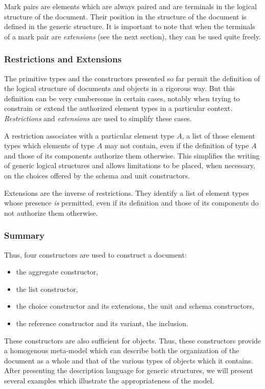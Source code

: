 Mark pairs are elements which are always paired and are terminals in
the logical structure of the document.  Their position in the
structure of the document is defined in the generic structure.  It is
important to note that when the terminals of a mark pair are {\em
extensions} (see the next section), they can be used quite freely.

\subsubsection{Restrictions and Extensions}
\label{restrictionextensions}

The primitive types and the constructors presented so far permit the
definition of the logical structure of documents and objects in a
rigorous way.  But this definition can be very cumbersome in certain
cases, notably when trying to constrain or extend the authorized
element types in a particular context.  {\em Restrictions} and {\em
extensions} are used to simplify these cases.

A restriction associates with a particular element type $A$, a list of
those element types which elements of type $A$ may not contain, even
if the definition of type $A$ and those of its components authorize
them otherwise.  This simplifies the writing of generic logical
structures and allows limitations to be placed, when necessary, on the
choices offered by the schema and unit constructors.

Extensions are the inverse of restrictions.  They identify a list of
element types whose presence {\em is} permitted, even if its
definition and those of its components do not authorize them
otherwise.

\subsubsection{Summary}

Thus, four constructors are used to construct a document:
\begin{itemize}
  \item the aggregate constructor,
  \item the list constructor,
  \item the choice constructor and its extensions, the unit and schema
constructors,
  \item the reference constructor and its variant, the inclusion.
\end{itemize}

These constructors are also sufficient for objects.  Thus, these
constructors provide a homogenous meta-model which can describe both
the organization of the document as a whole and that of the various
types of objects which it contains.  After presenting the description
language for generic structures, we will present several examples
which illustrate the appropriateness of the model.

